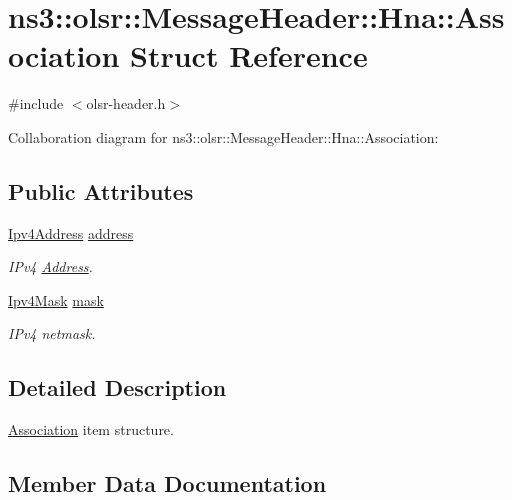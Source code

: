 \hypertarget{structns3_1_1olsr_1_1MessageHeader_1_1Hna_1_1Association}{}\section{ns3\+:\+:olsr\+:\+:Message\+Header\+:\+:Hna\+:\+:Association Struct Reference}
\label{structns3_1_1olsr_1_1MessageHeader_1_1Hna_1_1Association}


{\ttfamily \#include $<$olsr-\/header.\+h$>$}



Collaboration diagram for ns3\+:\+:olsr\+:\+:Message\+Header\+:\+:Hna\+:\+:Association\+:
\subsection*{Public Attributes}
\begin{DoxyCompactItemize}
\item 
\hyperlink{classns3_1_1Ipv4Address}{Ipv4\+Address} \hyperlink{structns3_1_1olsr_1_1MessageHeader_1_1Hna_1_1Association_a871247cb117a25255712a3765e1aa37b}{address}
\begin{DoxyCompactList}\small\item\em I\+Pv4 \hyperlink{classns3_1_1Address}{Address}. \end{DoxyCompactList}\item 
\hyperlink{classns3_1_1Ipv4Mask}{Ipv4\+Mask} \hyperlink{structns3_1_1olsr_1_1MessageHeader_1_1Hna_1_1Association_a794dfc31d34bc49d7812efff57f2bb2d}{mask}
\begin{DoxyCompactList}\small\item\em I\+Pv4 netmask. \end{DoxyCompactList}\end{DoxyCompactItemize}


\subsection{Detailed Description}
\hyperlink{structns3_1_1olsr_1_1MessageHeader_1_1Hna_1_1Association}{Association} item structure. 

\subsection{Member Data Documentation}
